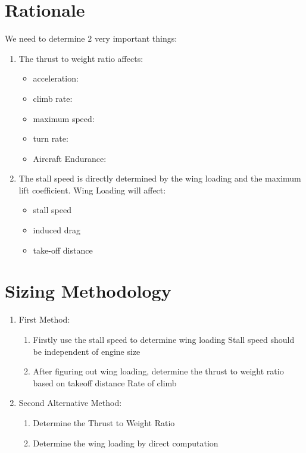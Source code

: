 \documentclass[letter, 12pt]{article}
\begin{document}
\maketitle
\newpage
\tableofcontents
\newpage
\begin{center}

\section{Rationale}
\begin{comment}
\end{comment}
We need to determine $2$ very important things:
\begin{enumerate}
\item The thrust to weight ratio affects:
\begin{itemize}
\item acceleration:
\item climb rate:
\item maximum speed:
\item turn rate:
\item Aircraft Endurance:
\end{itemize}
\item The stall speed is directly determined by the wing loading and the maximum lift coefficient. Wing Loading will affect:
\begin{itemize}
\item stall speed
\item induced drag
\item take-off distance
\end{itemize}
\end{enumerate}

\section{Sizing Methodology}
\begin{comment}
\end{comment}
\begin{enumerate}
\item First Method:
    \begin{enumerate}
    \item Firstly use the stall speed to determine wing loading
        Stall speed should be independent of engine size
    \item After figuring out wing loading, determine the thrust to weight ratio based on 
        takeoff distance
        Rate of climb
    \end{enumerate}
\item Second Alternative Method:
    \begin{enumerate}
    \item Determine the Thrust to Weight Ratio
    \item Determine the wing loading by direct computation 
    \end{enumerate}
\end{enumerate}


\end{center}
\end{document}
